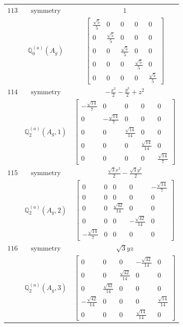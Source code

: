 \documentclass[fleqn,8pt,landscape]{jsarticle}
\begin{document}
\begin{longtable}{ccc}
$ 113 $ & $ \text{symmetry} $ & $ 1 $ \\
$  $ & $ \mathbb{Q}_{0}^{(a)}(A_{g}) $ & $ \begin{bmatrix} \frac{\sqrt{5}}{5} & 0 & 0 & 0 & 0 \\ 0 & \frac{\sqrt{5}}{5} & 0 & 0 & 0 \\ 0 & 0 & \frac{\sqrt{5}}{5} & 0 & 0 \\ 0 & 0 & 0 & \frac{\sqrt{5}}{5} & 0 \\ 0 & 0 & 0 & 0 & \frac{\sqrt{5}}{5} \end{bmatrix} $ \\ \hline
$ 114 $ & $ \text{symmetry} $ & $ - \frac{x^{2}}{2} - \frac{y^{2}}{2} + z^{2} $ \\
$  $ & $ \mathbb{Q}_{2}^{(a)}(A_{g},1) $ & $ \begin{bmatrix} - \frac{\sqrt{14}}{7} & 0 & 0 & 0 & 0 \\ 0 & - \frac{\sqrt{14}}{7} & 0 & 0 & 0 \\ 0 & 0 & \frac{\sqrt{14}}{14} & 0 & 0 \\ 0 & 0 & 0 & \frac{\sqrt{14}}{14} & 0 \\ 0 & 0 & 0 & 0 & \frac{\sqrt{14}}{7} \end{bmatrix} $ \\ \hline
$ 115 $ & $ \text{symmetry} $ & $ \frac{\sqrt{3} x^{2}}{2} - \frac{\sqrt{3} y^{2}}{2} $ \\
$  $ & $ \mathbb{Q}_{2}^{(a)}(A_{g},2) $ & $ \begin{bmatrix} 0 & 0 & 0 & 0 & - \frac{\sqrt{14}}{7} \\ 0 & 0 & 0 & 0 & 0 \\ 0 & 0 & \frac{\sqrt{42}}{14} & 0 & 0 \\ 0 & 0 & 0 & - \frac{\sqrt{42}}{14} & 0 \\ - \frac{\sqrt{14}}{7} & 0 & 0 & 0 & 0 \end{bmatrix} $ \\ \hline
$ 116 $ & $ \text{symmetry} $ & $ \sqrt{3} y z $ \\
$  $ & $ \mathbb{Q}_{2}^{(a)}(A_{g},3) $ & $ \begin{bmatrix} 0 & 0 & 0 & - \frac{\sqrt{42}}{14} & 0 \\ 0 & 0 & \frac{\sqrt{42}}{14} & 0 & 0 \\ 0 & \frac{\sqrt{42}}{14} & 0 & 0 & 0 \\ - \frac{\sqrt{42}}{14} & 0 & 0 & 0 & \frac{\sqrt{14}}{14} \\ 0 & 0 & 0 & \frac{\sqrt{14}}{14} & 0 \end{bmatrix} $ \\ \hline

\end{longtable}
\end{document}
